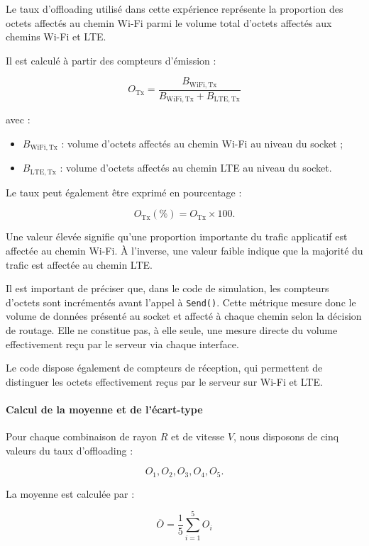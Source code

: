 Le taux d'offloading utilisé dans cette expérience représente
la proportion des octets affectés au chemin Wi-Fi parmi le
volume total d'octets affectés aux chemins Wi-Fi et LTE.

Il est calculé à partir des compteurs d'émission :

\[
\boxed{
O_{\mathrm{Tx}} =
\frac{B_{\mathrm{WiFi,Tx}}}
{B_{\mathrm{WiFi,Tx}}+B_{\mathrm{LTE,Tx}}}
}
\]

avec :

\begin{itemize}
\item $B_{\mathrm{WiFi,Tx}}$ : volume d'octets affectés au chemin
Wi-Fi au niveau du socket ;
\item $B_{\mathrm{LTE,Tx}}$ : volume d'octets affectés au chemin
LTE au niveau du socket.
\end{itemize}

Le taux peut également être exprimé en pourcentage :

\[
O_{\mathrm{Tx}}(\%) = O_{\mathrm{Tx}}\times 100.
\]

Une valeur élevée signifie qu'une proportion importante du trafic
applicatif est affectée au chemin Wi-Fi. À l'inverse, une valeur
faible indique que la majorité du trafic est affectée au chemin LTE.

Il est important de préciser que, dans le code de simulation,
les compteurs d'octets sont incrémentés avant l'appel à
\texttt{Send()}. Cette métrique mesure donc le volume de données
présenté au socket et affecté à chaque chemin selon la décision
de routage. Elle ne constitue pas, à elle seule, une mesure
directe du volume effectivement reçu par le serveur via chaque
interface.

Le code dispose également de compteurs de réception, qui
permettent de distinguer les octets effectivement reçus par
le serveur sur Wi-Fi et LTE.

\paragraph{Calcul de la moyenne et de l'écart-type}

Pour chaque combinaison de rayon $R$ et de vitesse $V$,
nous disposons de cinq valeurs du taux d'offloading :

\[
O_1,O_2,O_3,O_4,O_5.
\]

La moyenne est calculée par :

\[
\boxed{
\overline{O} =
\frac{1}{5}\sum_{i=1}^{5} O_i
}
\]

